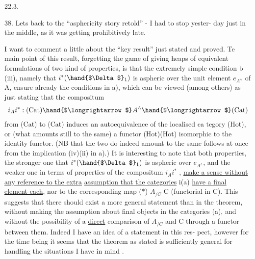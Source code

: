 
22.3.

38. Lets  back to the ``asphericity story retold'' - I had to stop yester-%
day just in the middle, as it was getting prohibitively late.

I want to comment a little about the ``key result'' just stated and
proved. Te main point of this result, forgetting the game of giving
heaps of equivalent formulations of two kind of properties, is that the
extremely simple condition b (iii), namely that $i^{*}(\hand{$\Delta$}_1)$ is aspheric over
the unit element $e_{A^\wedge}$ of A, ensure already the conditions in a), which
can be viewed (among others) as just stating that the compositum
\[ i_A i^{*} : \text{(Cat)} \hand{$\longrightarrow$} A^\wedge \hand{$\longrightarrow$} \text{(Cat)} \]
 from (Cat) to (Cat) induces an autoequivalence of the localised ca%
tegory (Hot), or (what amounts still to the same) a functor (Hot)\hand{$\to$}(Hot)
 isomorphic to the identity functor. (NB that the two do indeed amount
to the same follows at once from the implication (iv)\hand{$\Rightarrow$}(ii) in a).) It
is interesting to note that both properties, the stronger one that
$i^{*}(\hand{$\Delta$}_1)$ is aspheric over $e_{A^\wedge}$, and the weaker one in terms of properties
of the compositum $i_A i^{*}$ , \uline{make a sense without any reference to the extra}
\uline{assumption that the categories} i(a) \uline{have a final element each}, nor to the
corresponding map ($*$) $A_{/C}$ \hand{$\to$} C (functorial in C). This suggests that
there should exist a more general statement than in the theorem, without
making the assumption about final objects in the categories (a), and
without the possibility of a \uline{direct} comparison of $A_{/C}$ and C through a
functor between them. Indeed I have an idea of a statement in this res-%
 pect, however for the time being it seems that the theorem as stated is
sufficiently general for handling the situations I have in mind .

